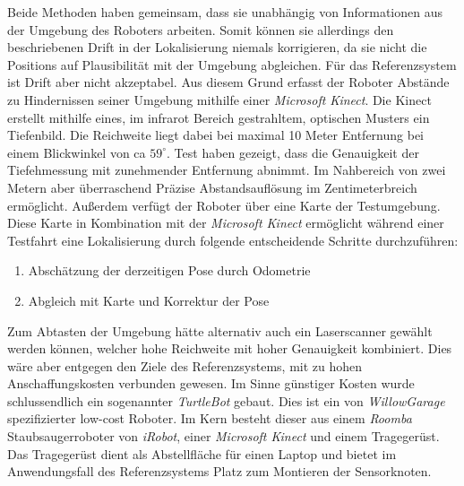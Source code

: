 Beide Methoden haben gemeinsam, dass sie unabhängig von Informationen aus der
Umgebung des Roboters arbeiten. Somit können sie allerdings den beschriebenen
Drift in der Lokalisierung niemals korrigieren, da sie nicht die Positions auf
Plausibilität mit der Umgebung abgleichen.  Für das Referenzsystem ist Drift
aber nicht akzeptabel. Aus diesem Grund erfasst der Roboter Abstände zu
Hindernissen seiner Umgebung mithilfe einer \textit{Microsoft Kinect}. Die
Kinect erstellt mithilfe eines, im infrarot Bereich gestrahltem, optischen
Musters ein Tiefenbild.  Die Reichweite liegt dabei bei maximal 10 Meter
Entfernung bei einem Blickwinkel von ca $59^{\circ}$.
Test haben gezeigt, dass die Genauigkeit der Tiefehmessung mit zunehmender
Entfernung abnimmt. Im Nahbereich von zwei Metern aber überraschend Präzise
Abstandsauflösung im Zentimeterbreich ermöglicht.  Außerdem verfügt der Roboter
über eine Karte der Testumgebung. Diese Karte in Kombination mit der
\textit{Microsoft Kinect} ermöglicht während einer Testfahrt eine Lokalisierung
durch folgende entscheidende Schritte durchzuführen:

\begin{enumerate}
  \item Abschätzung der derzeitigen Pose durch Odometrie
  \item Abgleich mit Karte und Korrektur der Pose
\end{enumerate}

Zum Abtasten der Umgebung hätte alternativ auch ein Laserscanner gewählt werden
können, welcher hohe Reichweite mit hoher Genauigkeit kombiniert. Dies wäre
aber entgegen den Ziele des Referenzsystems, mit zu hohen Anschaffungskosten
verbunden gewesen. Im Sinne günstiger Kosten wurde schlussendlich ein
sogenannter \textit{TurtleBot} gebaut. Dies ist ein von \textit{WillowGarage}
spezifizierter low-cost Roboter.
Im Kern besteht dieser aus einem \textit{Roomba} Staubsaugerroboter von \textit{iRobot}, 
einer \textit{Microsoft Kinect} und einem Tragegerüst. Das Tragegerüst dient als
Abstellfläche für einen Laptop und bietet im Anwendungsfall des Referenzsystems
Platz zum Montieren der Sensorknoten.


